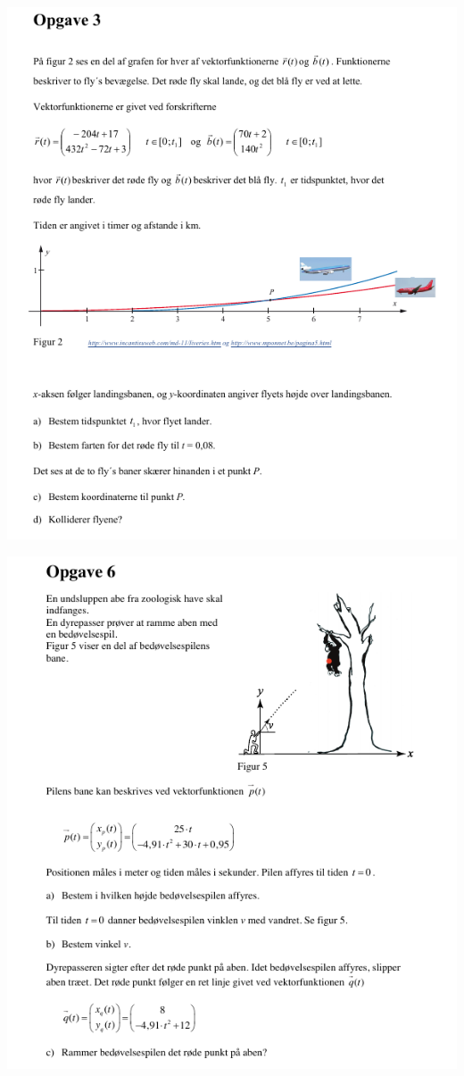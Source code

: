 \documentclass[a4paper, 12pt]{article}
\begin{document}
\begin{center}
\includegraphics[width=.9\linewidth]{img/opg1.png}
\end{center}
\begin{center}
\includegraphics[width=.9\linewidth]{img/opg2.png}
\end{center}
\end{document}

